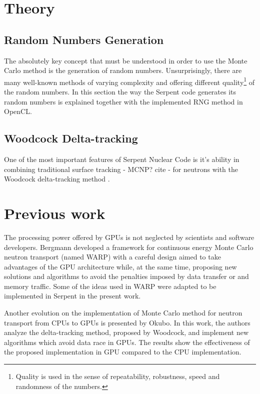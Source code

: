 \documentclass[twoside,a4paper,12pt,english,draft]{anstrans}
\begin{document}
\section{Theory}

\subsection{Random Numbers Generation}
The absolutely key concept that must be understood in order to use the Monte Carlo method is
the generation of random numbers. Unsurprisingly, there are many well-known methods of varying
complexity and offering different quality\footnote{Quality is used in the sense of
  repeatability, robustness, speed and randomness of the numbers.} of the random numbers.
In this section the way the Serpent code generates its random numbers is explained together
with the implemented RNG method in OpenCL.


\subsection{Woodcock Delta-tracking}

One of the most important features of Serpent Nuclear Code is it's ability in combining
traditional surface tracking - MCNP? cite - for neutrons with the Woodcock delta-tracking method \cite{Woodcock1965}.

\section{Previous work}

The processing power offered by GPUs is not neglected by scientists and software developers.
Bergmann\cite{Bergmann2014} developed a framework for continuous energy Monte Carlo neutron
transport (named WARP) with a careful design aimed to take advantages of the GPU architecture while, at the
same time, proposing new solutions and algorithms to avoid the penalties imposed by data transfer
or and memory traffic. Some of the ideas used in WARP were adapted to be implemented in Serpent in
the present work.

Another evolution on the implementation of Monte Carlo method for neutron transport from CPUs to GPUs
is presented by Okubo\cite{Okubo2016}. In this work, the authors analyze the delta-tracking method,
proposed by Woodcock\cite{Woodcock1965}, and implement new algorithms which avoid data race in
GPUs. The results show the effectiveness of the proposed implementation in GPU compared to the CPU
implementation.
\end{document}
